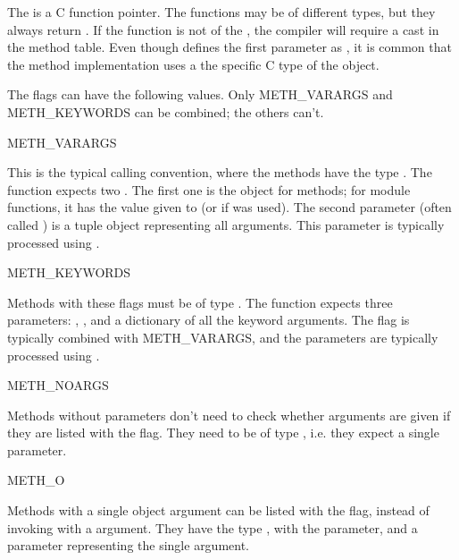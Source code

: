 \documentclass{manual}
\begin{document}
The  is a C function pointer. The functions may be of
different types, but they always return . If the
function is not of the , the compiler will require
a cast in the method table. Even though  defines
the first parameter as , it is common that the method
implementation uses a the specific C type of the  object.

The flags can have the following values. Only METH_VARARGS and
METH_KEYWORDS can be combined; the others can't.

\begin{datadesc}{METH_VARARGS}

This is the typical calling convention, where the methods have the
type . The function expects two .
The first one is the  object for methods; for module
functions, it has the value given to  (or
\NULL{} if  was used). The second parameter
(often called ) is a tuple object representing all
arguments. This parameter is typically processed using
.

\end{datadesc}

\begin{datadesc}{METH_KEYWORDS}

Methods with these flags must be of type
.  The function expects three
parameters: , , and a dictionary of all the keyword
arguments. The flag is typically combined with METH_VARARGS, and the
parameters are typically processed using
.

\end{datadesc}

\begin{datadesc}{METH_NOARGS}

Methods without parameters don't need to check whether arguments are
given if they are listed with the  flag. They need
to be of type , i.e. they expect a single
 parameter.

\end{datadesc}

\begin{datadesc}{METH_O}

Methods with a single object argument can be listed with the
 flag, instead of invoking 
with a  argument. They have the type ,
with the  parameter, and a  parameter
representing the single argument.

\end{datadesc}
\end{document}
